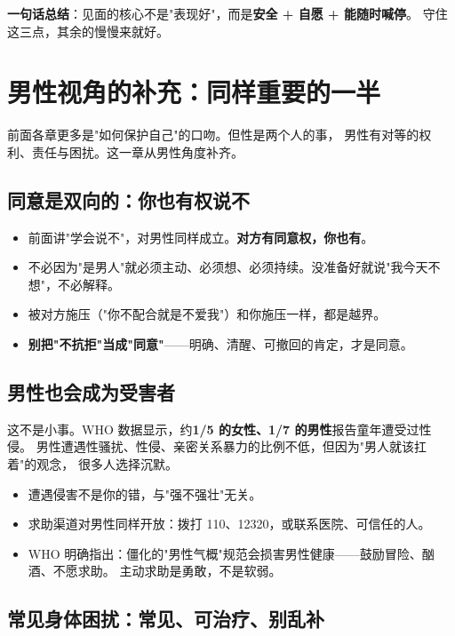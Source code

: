 \noindent\textbf{一句话总结}：见面的核心不是"表现好"，而是\textbf{安全 + 自愿 + 能随时喊停}。
守住这三点，其余的慢慢来就好。

\chapter{男性视角的补充：同样重要的一半}
\label{chap:male}

前面各章更多是"如何保护自己"的口吻。但性是两个人的事，
男性有对等的权利、责任与困扰。这一章从男性角度补齐。

\section{同意是双向的：你也有权说不}

\begin{itemize}[leftmargin=2em]
  \item 前面讲"学会说不"，对男性同样成立。\textbf{对方有同意权，你也有}。
  \item 不必因为"是男人"就必须主动、必须想、必须持续。没准备好就说"我今天不想"，不必解释。
  \item 被对方施压（"你不配合就是不爱我"）和你施压一样，都是越界。
  \item \textbf{别把"不抗拒"当成"同意"}——明确、清醒、可撤回的肯定，才是同意。
\end{itemize}

\section{男性也会成为受害者}

这不是小事。WHO 数据显示，约\textbf{1/5 的女性、1/7 的男性}报告童年遭受过性侵。
男性遭遇性骚扰、性侵、亲密关系暴力的比例不低，但因为"男人就该扛着"的观念，
很多人选择沉默。

\begin{itemize}[leftmargin=2em]
  \item 遭遇侵害不是你的错，与"强不强壮"无关。
  \item 求助渠道对男性同样开放：拨打 110、12320，或联系医院、可信任的人。
  \item WHO 明确指出：僵化的"男性气概"规范会损害男性健康——鼓励冒险、酗酒、不愿求助。
        主动求助是勇敢，不是软弱。
\end{itemize}

\section{常见身体困扰：常见、可治疗、别乱补}

